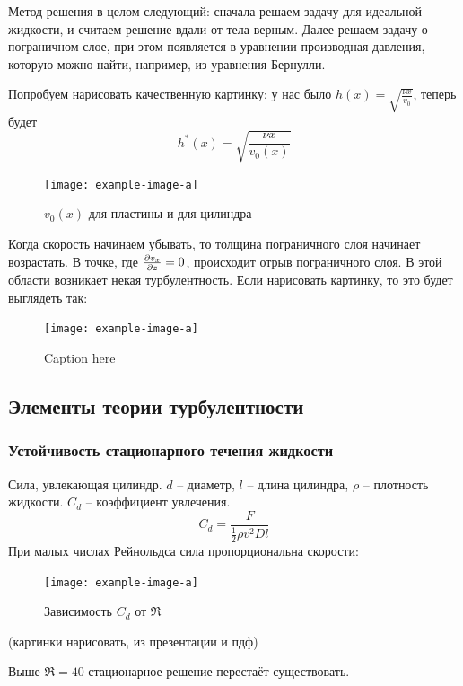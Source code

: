 Метод решения в целом следующий: сначала решаем задачу для идеальной жидкости, и считаем решение вдали от тела верным. Далее решаем задачу о пограничном слое, при этом появляется в уравнении производная давления,
которую можно найти, например, из уравнения Бернулли.

Попробуем нарисовать качественную картинку: у нас было $h(x)=\sqrt{\frac{\nu x}{v_0}}$, теперь будет 
\begin{equation}
    h^*(x) = \sqrt{\frac{\nu x}{v_0 (x)}}
\end{equation}
\begin{figure}[H]
    \centering
    \texttt{[image: example-image-a]}
    \caption{$v_0(x)$ для пластины и для цилиндра}
    \label{fig:figure1}
\end{figure}
Когда скорость начинаем убывать, то толщина пограничного слоя начинает 
возрастать. В точке, где $\pdv{v_x}{z}=0$, происходит отрыв пограничного
 слоя. В этой области возникает некая турбулентность. Если нарисовать картинку, то это будет выглядеть так:
\begin{figure}[H]
    \centering
    \texttt{[image: example-image-a]}
    \caption{Caption here}
    \label{fig:figure1}
\end{figure}

\subsection{Элементы теории турбулентности}
\subsubsection{Устойчивость стационарного течения жидкости}
Сила, увлекающая цилиндр. $d$ -- диаметр, $l$ -- длина цилиндра,
$\rho$ -- плотность жидкости. $C_d$ -- коэффициент увлечения.
\begin{equation}
    C_d  = \frac{F}{\frac{1}{2} \rho v^2 Dl}
\end{equation}
При малых числах Рейнольдса сила пропорциональна скорости:
\begin{figure}[H]
    \centering
    \texttt{[image: example-image-a]}
    \caption{Зависимость $C_d$ от $\Re$}
    \label{fig:cdre}
\end{figure}

(картинки нарисовать, из презентации и пдф)

Выше $\Re=40$ стационарное решение перестаёт существовать.

